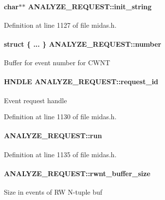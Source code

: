 \paragraph[{init\_\-string}]{\setlength{\rightskip}{0pt plus 5cm}char$\ast$$\ast$ {\bf ANALYZE\_\-REQUEST::init\_\-string}}\hfill\label{structANALYZE__REQUEST_a5548cf9631c680e83a6a3715a14b16f5}


Definition at line 1127 of file midas.h.
\paragraph[{number}]{\setlength{\rightskip}{0pt plus 5cm}struct \{ ... \}   {\bf ANALYZE\_\-REQUEST::number}}\hfill\label{structANALYZE__REQUEST_ad0d985c8ce031a4515988723e07b2ee0}
Buffer for event number for CWNT 
\paragraph[{request\_\-id}]{\setlength{\rightskip}{0pt plus 5cm}HNDLE {\bf ANALYZE\_\-REQUEST::request\_\-id}}\hfill\label{structANALYZE__REQUEST_a2ee7a01967465e8a725bb968246c01de}
Event request handle 

Definition at line 1130 of file midas.h.
\paragraph[{run}]{ {\bf ANALYZE\_\-REQUEST::run}}\hfill\label{structANALYZE__REQUEST_a8ab25f33bbb1a45800975dd5d87b0caf}


Definition at line 1135 of file midas.h.
\paragraph[{rwnt\_\-buffer\_\-size}]{ {\bf ANALYZE\_\-REQUEST::rwnt\_\-buffer\_\-size}}\hfill\label{structANALYZE__REQUEST_ab9f17100ff718ee4da42cdd86a7f3cab}
Size in events of RW N-\/tuple buf 

